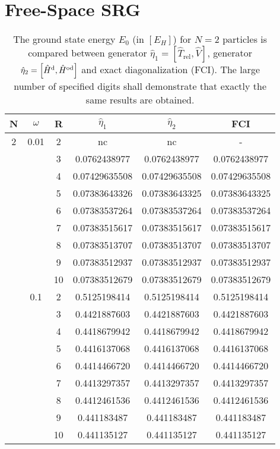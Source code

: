 \section{Free-Space SRG}
\begin{table}[h!]
\begin{center}

\begin{tabular}{|c|c|c|c|c|c|}
\hline\hline
N&$\omega$ &R & $\hat{\eta}_1$ & $\hat{\eta}_2$ & FCI \\
\hline
2&  0.01   & 2&  nc&nc & -      \\
 &         & 3 & 0.0762438977      &0.0762438977   & 0.0762438977  \\
 &         & 4 & 0.07429635508    &  0.07429635508   & 0.07429635508   \\
 &         & 5 & 0.07383643326    & 0.07383643325     & 0.07383643325  \\
 &         & 6 & 0.07383537264    & 0.07383537264    & 0.07383537264  \\
 &         & 7 & 0.07383515617    &  0.07383515617    & 0.07383515617  \\
 &         & 8 & 0.07383513707    & 0.07383513707     &  0.07383513707  \\
 &         & 9 &  0.07383512937   & 0.07383512937      &  0.07383512937    \\
 &         & 10& 0.07383512679    & 0.07383512679   & 0.07383512679   \\  
 \hline   
 &  0.1    & 2 &  0.5125198414    & 0.5125198414   & 0.5125198414             \\
 &         & 3 &  0.4421887603    & 0.4421887603    & 0.4421887603               \\
 &         & 4 & 0.4418679942     &  0.4418679942   & 0.4418679942         \\
 &         & 5 & 0.4416137068     & 0.4416137068    & 0.4416137068          \\
 &         & 6 & 0.4414466720      & 0.4414466720    & 0.4414466720           \\
 &         & 7 & 0.4413297357     & 0.4413297357   & 0.4413297357         \\
 &         & 8 & 0.4412461536    & 0.4412461536    & 0.4412461536             \\
 &         & 9 & 0.441183487     &0.441183487     & 0.441183487              \\
 &         & 10& 0.441135127     &0.441135127     & 0.441135127               \\ 
 \hline\hline
 \end{tabular}
 
\end{center}
\caption{The ground state energy $E_0$ (in $\left[E_H\right]$) for $N=2$ particles is compared between generator $\hat{\eta}_1 = \left[ \hat{T}_{\text{rel}}, \hat{V}\right]$, generator  $\hat{\eta}_2 = \left[ \hat{H}^{\rm d}, \hat{H}^{\rm od} \right]$ and exact diagonalization (FCI). The large number of specified digits shall demonstrate that exactly the same results are obtained.}
\label{tab:full1}
\end{table}

